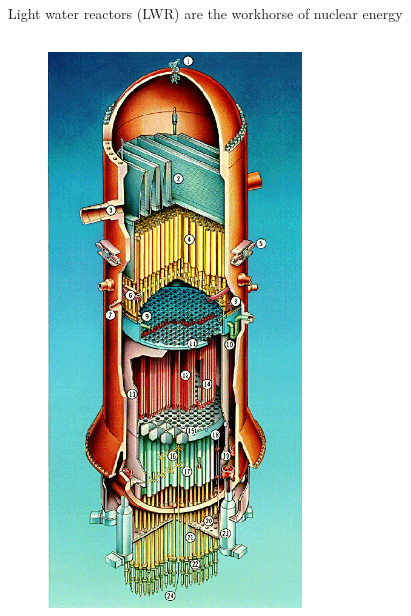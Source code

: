 \documentclass{beamer}
\begin{document}
\begin{frame}{Light water reactors (LWR) are the workhorse of nuclear energy}
\begin{columns}[T]
            \begin{column}{0.5\textwidth}
                \begin{figure}
                    \centering
                    \includegraphics[width=0.6\textwidth]{./img/bwrCore.png}
                    \caption*{}
                \end{figure}
            \end{column}

        \end{columns}

    \end{frame}
\end{document}
